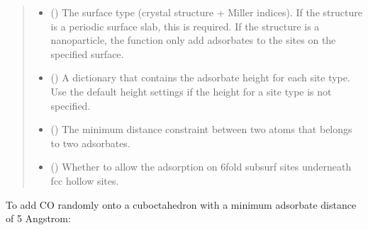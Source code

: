 \documentclass[letterpaper,10pt,english]{sphinxmanual}
\begin{document}
\begin{fulllineitems}
\begin{quote}
\begin{description}
\begin{itemize}
\item {} 
 (\sphinxstyleliteralemphasis{\sphinxupquote{, }}) \textendash{} The surface type (crystal structure + Miller indices).
If the structure is a periodic surface slab, this is required.
If the structure is a nanoparticle, the function only add
adsorbates to the sites on the specified surface.

\item {} 
 (\sphinxstyleliteralemphasis{\sphinxupquote{, }}) \textendash{} A dictionary that contains the adsorbate height for each site
type. Use the default height settings if the height for a site
type is not specified.

\item {} 
 (\sphinxstyleliteralemphasis{\sphinxupquote{, }}) \textendash{} The minimum distance constraint between two atoms that belongs
to two adsorbates.

\item {} 
 (\sphinxstyleliteralemphasis{\sphinxupquote{, }}) \textendash{} Whether to allow the adsorption on 6\sphinxhyphen{}fold subsurf sites
underneath fcc hollow sites.

\end{itemize}

\end{description}\end{quote}

\end{fulllineitems}



To add CO randomly onto a cuboctahedron with a minimum adsorbate
distance of 5 Angstrom:
\end{document}
